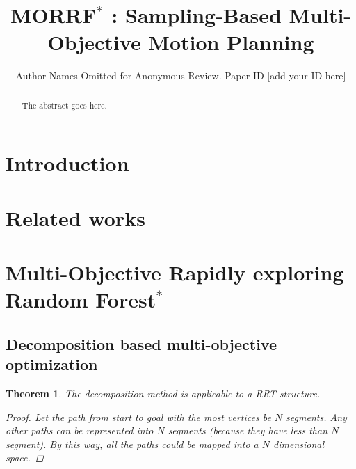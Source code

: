 \documentclass[conference]{IEEEtran}
\newtheorem{thm}{Theorem}
\begin{document}
\title{ MORRF$^{*}$ : Sampling-Based Multi-Objective Motion Planning }

\author{Author Names Omitted for Anonymous Review. Paper-ID [add your ID here]}

\maketitle

\begin{abstract}
The abstract goes here.
\end{abstract}

\IEEEpeerreviewmaketitle

\section{Introduction}
\label{sec:intro}

\section{Related works}
\label{sec:related_works}

\section{Multi-Objective Rapidly exploring Random Forest$^{*}$}
\label{sec:morrt}

\subsection{Decomposition based multi-objective optimization}


\begin{thm}
\label{thm:moo-d:rrt}
The decomposition method is applicable to a RRT structure.
\begin{proof}
Let the path from start to goal with the most vertices be $ N $ segments.
Any other paths can be represented into $ N $ segments (because they have less than $ N $ segment).
By this way, all the paths could be mapped into a $ N $ dimensional space.
\end{proof}
\end{thm}
\end{document}
